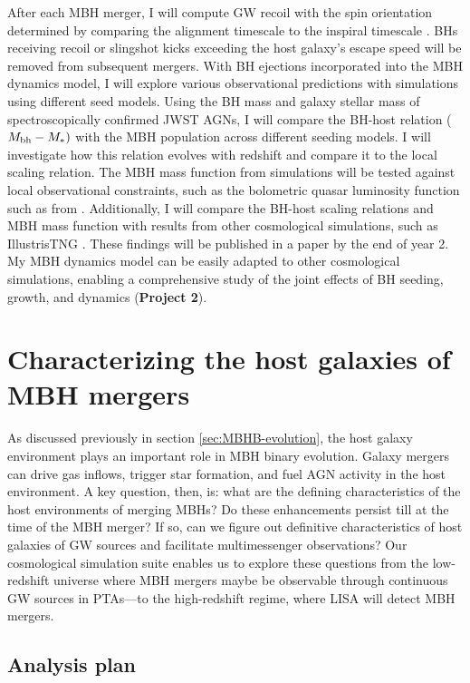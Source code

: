 \documentclass[11pt, letterpaper]{article}
\begin{document}
After each MBH merger, I will compute GW recoil with the spin orientation determined by comparing the alignment timescale to the inspiral timescale \citep{sayeb_massive_2021}. BHs receiving recoil or slingshot kicks exceeding the host galaxy’s escape speed will be removed from subsequent mergers. With BH ejections incorporated into the MBH dynamics model, I will explore various observational predictions with simulations using different seed models. Using the BH mass and galaxy stellar mass of spectroscopically confirmed JWST AGNs, I will compare the BH-host relation ($M_{\rm bh} - M_{*})$ with the MBH population across different seeding models. I will investigate how this relation evolves with redshift and compare it to the local scaling relation. The MBH mass function from simulations will be tested against local observational constraints, such as the bolometric quasar luminosity function such as from \citet{Shen_2020}. Additionally, I will compare the BH-host scaling relations and MBH mass function with results from other cosmological simulations, such as IllustrisTNG \citep{Springel_2017}. These findings will be published in a paper by the end of year 2. My MBH dynamics model can be easily adapted to other cosmological simulations, enabling a comprehensive study of the joint effects of BH seeding, growth, and dynamics (\textbf{Project 2}).



\section{Characterizing the host galaxies of MBH mergers}
\label{sec:host-galaxy-project}

As discussed previously in section \ref{sec:MBHB-evolution}, the host galaxy environment plays an important role in MBH binary evolution. Galaxy mergers can drive gas inflows, trigger star formation, and fuel AGN activity in the host environment. A key question, then, is: what are the defining characteristics of the host environments of merging MBHs? Do these enhancements persist till at the time of the MBH merger? If so, can we figure out definitive characteristics of host galaxies of GW sources and facilitate multimessenger observations? Our cosmological simulation suite enables us to explore these questions from the  low-redshift universe where MBH mergers maybe be observable through continuous GW  sources in PTAs—to the high-redshift regime, where LISA will detect MBH mergers.

\subsection{Analysis plan}
\end{document}
